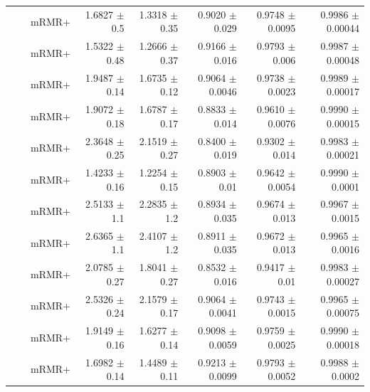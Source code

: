 \begin{longtable}{llp{}rrrrr}
 &  & mRMR+ & 1.6827 {\scriptsize $\pm$ 0.5} & 1.3318 {\scriptsize $\pm$ 0.35} & 0.9020 {\scriptsize $\pm$ 0.029} & 0.9748 {\scriptsize $\pm$ 0.0095} & 0.9986 {\scriptsize $\pm$ 0.00044} \\
 &  & mRMR+ & 1.5322 {\scriptsize $\pm$ 0.48} & 1.2666 {\scriptsize $\pm$ 0.37} & 0.9166 {\scriptsize $\pm$ 0.016} & 0.9793 {\scriptsize $\pm$ 0.006} & 0.9987 {\scriptsize $\pm$ 0.00048} \\
 &  & mRMR+ & 1.9487 {\scriptsize $\pm$ 0.14} & 1.6735 {\scriptsize $\pm$ 0.12} & 0.9064 {\scriptsize $\pm$ 0.0046} & 0.9738 {\scriptsize $\pm$ 0.0023} & 0.9989 {\scriptsize $\pm$ 0.00017} \\
 &  & mRMR+ & 1.9072 {\scriptsize $\pm$ 0.18} & 1.6787 {\scriptsize $\pm$ 0.17} & 0.8833 {\scriptsize $\pm$ 0.014} & 0.9610 {\scriptsize $\pm$ 0.0076} & 0.9990 {\scriptsize $\pm$ 0.00015} \\
 &  & mRMR+ & 2.3648 {\scriptsize $\pm$ 0.25} & 2.1519 {\scriptsize $\pm$ 0.27} & 0.8400 {\scriptsize $\pm$ 0.019} & 0.9302 {\scriptsize $\pm$ 0.014} & 0.9983 {\scriptsize $\pm$ 0.00021} \\
 &  & mRMR+ & 1.4233 {\scriptsize $\pm$ 0.16} & 1.2254 {\scriptsize $\pm$ 0.15} & 0.8903 {\scriptsize $\pm$ 0.01} & 0.9642 {\scriptsize $\pm$ 0.0054} & 0.9990 {\scriptsize $\pm$ 0.0001} \\
 &  & mRMR+ & 2.5133 {\scriptsize $\pm$ 1.1} & 2.2835 {\scriptsize $\pm$ 1.2} & 0.8934 {\scriptsize $\pm$ 0.035} & 0.9674 {\scriptsize $\pm$ 0.013} & 0.9967 {\scriptsize $\pm$ 0.0015} \\
 &  & mRMR+ & 2.6365 {\scriptsize $\pm$ 1.1} & 2.4107 {\scriptsize $\pm$ 1.2} & 0.8911 {\scriptsize $\pm$ 0.035} & 0.9672 {\scriptsize $\pm$ 0.013} & 0.9965 {\scriptsize $\pm$ 0.0016} \\
 &  & mRMR+ & 2.0785 {\scriptsize $\pm$ 0.27} & 1.8041 {\scriptsize $\pm$ 0.27} & 0.8532 {\scriptsize $\pm$ 0.016} & 0.9417 {\scriptsize $\pm$ 0.01} & 0.9983 {\scriptsize $\pm$ 0.00027} \\
 &  & mRMR+ & 2.5326 {\scriptsize $\pm$ 0.24} & 2.1579 {\scriptsize $\pm$ 0.17} & 0.9064 {\scriptsize $\pm$ 0.0041} & 0.9743 {\scriptsize $\pm$ 0.0015} & 0.9965 {\scriptsize $\pm$ 0.00075} \\
 &  & mRMR+ & 1.9149 {\scriptsize $\pm$ 0.16} & 1.6277 {\scriptsize $\pm$ 0.14} & 0.9098 {\scriptsize $\pm$ 0.0059} & 0.9759 {\scriptsize $\pm$ 0.0025} & 0.9990 {\scriptsize $\pm$ 0.00018} \\
 &  & mRMR+ & 1.6982 {\scriptsize $\pm$ 0.14} & 1.4489 {\scriptsize $\pm$ 0.11} & 0.9213 {\scriptsize $\pm$ 0.0099} & 0.9793 {\scriptsize $\pm$ 0.0052} & 0.9988 {\scriptsize $\pm$ 0.0002} \\
\end{longtable}